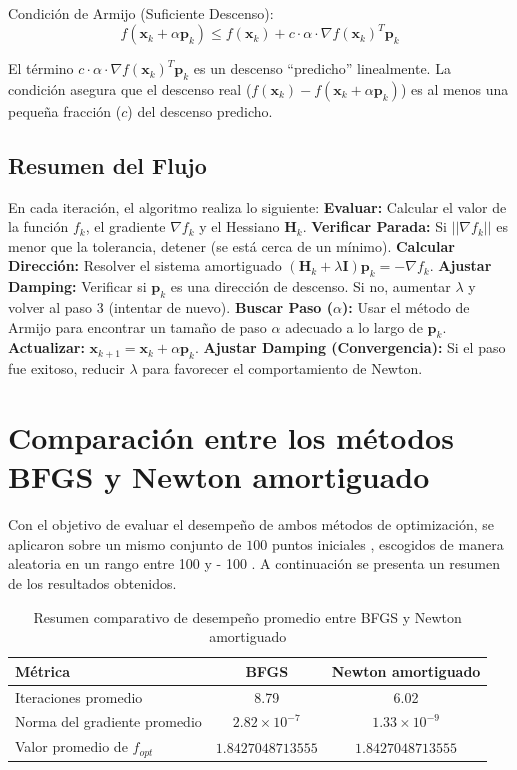 \documentclass{article}
\begin{document}
Condición de Armijo (Suficiente Descenso):
\[
f(\mathbf{x}_k + \alpha \mathbf{p}_k) \le f(\mathbf{x}_k) + c \cdot \alpha \cdot \nabla f(\mathbf{x}_k)^T \mathbf{p}_k
\]

El término $c \cdot \alpha \cdot \nabla f(\mathbf{x}_k)^T \mathbf{p}_k$ es un descenso ``predicho'' linealmente. La condición asegura que el descenso real ($f(\mathbf{x}_k) - f(\mathbf{x}_k + \alpha \mathbf{p}_k)$) es al menos una pequeña fracción ($c$) del descenso predicho.

\subsection*{ Resumen del Flujo}

En cada iteración, el algoritmo realiza lo siguiente:
\textbf{Evaluar:} Calcular el valor de la función $f_k$, el gradiente $\nabla f_k$ y el Hessiano $\mathbf{H}_k$.
\textbf{Verificar Parada:} Si $||\nabla f_k||$ es menor que la tolerancia, detener (se está cerca de un mínimo).
\textbf{Calcular Dirección:} Resolver el sistema amortiguado $(\mathbf{H}_k + \lambda \mathbf{I}) \mathbf{p}_k = -\nabla f_k$.
 \textbf{Ajustar Damping:} Verificar si $\mathbf{p}_k$ es una dirección de descenso. Si no, aumentar $\lambda$ y volver al paso 3 (intentar de nuevo).
 \textbf{Buscar Paso ($\alpha$):} Usar el método de Armijo para encontrar un tamaño de paso $\alpha$ adecuado a lo largo de $\mathbf{p}_k$.
 \textbf{Actualizar:} $\mathbf{x}_{k+1} = \mathbf{x}_k + \alpha \mathbf{p}_k$.
 \textbf{Ajustar Damping (Convergencia):} Si el paso fue exitoso, reducir $\lambda$ para favorecer el comportamiento de Newton.











\section{Comparación entre los métodos BFGS y Newton amortiguado}

Con el objetivo de evaluar el desempeño de ambos métodos de optimización, se aplicaron sobre un mismo conjunto de $100$ puntos iniciales , escogidos de manera aleatoria en un rango entre 100 y - 100 . A continuación se presenta un resumen de los resultados obtenidos.

\begin{table}[H]
\centering
\caption{Resumen comparativo de desempeño promedio entre BFGS y Newton amortiguado}
\begin{tabular}{lcc}
\toprule
\textbf{Métrica} & \textbf{BFGS} & \textbf{Newton amortiguado} \\
\midrule
Iteraciones promedio & 8.79 & 6.02 \\
Norma del gradiente promedio & $2.82\times 10^{-7}$ & $1.33\times 10^{-9}$ \\
Valor promedio de $f_{opt}$ & $1.8427048713555$ & $1.8427048713555$ \\
\bottomrule
\end{tabular}
\end{table}
\end{document}

